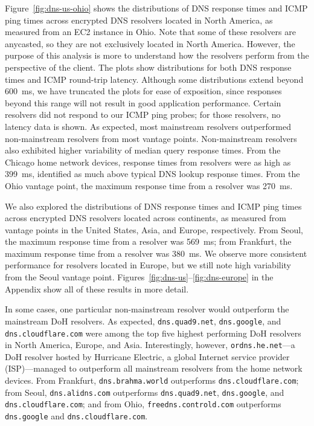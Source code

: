Figure~\ref{fig:dns-us-ohio} shows the distributions of DNS response times and
ICMP ping times across encrypted DNS resolvers located in North America, as
measured from an EC2 instance in Ohio. Note that some of these resolvers are anycasted,
so they are not exclusively located in North America. However, the purpose of this analysis
is more to understand how the resolvers perform from the perspective of the client.
The plots show distributions for both DNS response times and ICMP round-trip latency.  Although some distributions
extend beyond 600~ms, we have truncated the plots for ease of exposition,
since responses beyond this range will not result in good application
performance.  Certain resolvers did not respond to our ICMP ping probes; for
those resolvers, no latency data is shown.
As expected, most mainstream resolvers outperformed non-mainstream resolvers
from most vantage points.  Non-mainstream resolvers also exhibited higher
variability of median query response times.  
From the Chicago home network devices, response times from resolvers were as
high as 399~ms, identified as much above typical DNS lookup response times.
From the Ohio vantage point, the maximum response time from a resolver was 270~ms. 

We also explored the distributions of DNS response times and ICMP ping times
across encrypted DNS resolvers located across continents, as measured from
vantage points in the United States, Asia, and Europe, respectively.  From
Seoul, the maximum response time from a resolver was 569~ms; from Frankfurt,
the maximum response time from a resolver was 380~ms.  We observe more
consistent performance for resolvers located in Europe, but we still note high
variability from the Seoul vantage point.
Figures~\ref{fig:dns-us}--\ref{fig:dns-europe} in the Appendix show all of
these results in more detail.

In some cases, one particular non-mainstream resolver would outperform
the mainstream DoH resolvers.  As expected, \texttt{dns.quad9.net},
\texttt{dns.google}, and \texttt{dns.cloudflare.com} were among the top five
highest performing DoH resolvers in North America, Europe, and Asia.
Interestingly, however, \texttt{ordns.he.net}---a DoH resolver hosted by
Hurricane Electric, a global Internet service provider (ISP)---managed to
outperform all mainstream resolvers from the home network devices. From Frankfurt, \texttt{dns.brahma.world}
outperforms \texttt{dns.cloudflare.com}; from Seoul, \texttt{dns.alidns.com} outperforms \texttt{dns.quad9.net},
\texttt{dns.google}, and \texttt{dns.cloudflare.com}; and from Ohio, \texttt{freedns.controld.com} outperforms \texttt{dns.google}
and \texttt{dns.cloudflare.com}.

